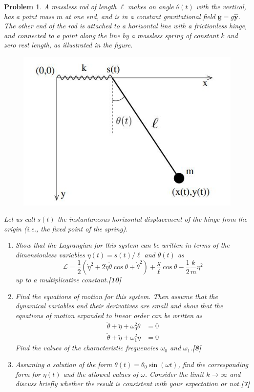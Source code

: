 \documentclass[a4paper]{article}
\theoremstyle{new}
\newtheorem{qns}{Problem}[section]
\begin{document}
\begin{qns}
A massless rod of length $\ell$ makes an angle $\theta(t)$ with the vertical, has a point mass $m$ at one end, and is in a constant gravitational field $\mathbf{g} = g\mathbf{\hat{y}}$. The other end of the rod is attached to a horizontal line with a frictionless hinge, and connected to a point along the line by a massless spring of constant $k$ and zero rest length, as illustrated in the figure.
\begin{figure}[H]
    \centering
    \includegraphics[scale=0.5]{2018TP1Q2.JPG}
\end{figure}
Let us call $s(t)$ the instantaneous horizontal displacement of the hinge from the origin (i.e., the fixed point of the spring).
\begin{enumerate}[label=(\alph*)]
\item Show that the Lagrangian for this system can be written in terms of the dimensionless variables $\eta(t) = s(t)/\ell$ and $\theta(t)$ as
$$\mathcal{L}=\frac{1}{2}(\dot{\eta}^2+2\dot{\eta}\dot{\theta}\cos\theta+\dot{\theta}^2)+\frac{g}{\ell}\cos\theta-\frac{1}{2}\frac{k}{m}\eta^2$$
up to a multiplicative constant.\hfill\textbf{[10]}
\item Find the equations of motion for this system. Then assume that the dynamical variables and their derivatives are small and show that the equations of motion expanded to linear order can be written as
\begin{align}
    \ddot{\theta}+\ddot{\eta}+\omega_0^2\theta&=0\nonumber\\\ddot{\theta}+\ddot{\eta}+\omega_1^2\eta&=0\nonumber
\end{align}
Find the values of the characteristic frequencies $\omega_0$ and $\omega_1$.\hfill\textbf{[8]}
\item Assuming a solution of the form $\theta(t) = \theta_0\sin(\omega t)$, find the corresponding form for $\eta(t)$ and the allowed values of $\omega$. Consider the limit $k\rightarrow\infty$ and discuss briefly whether the result is consistent with your expectation or not.\hfill\textbf{[7]}
\end{enumerate}
\end{qns}
\end{document}

